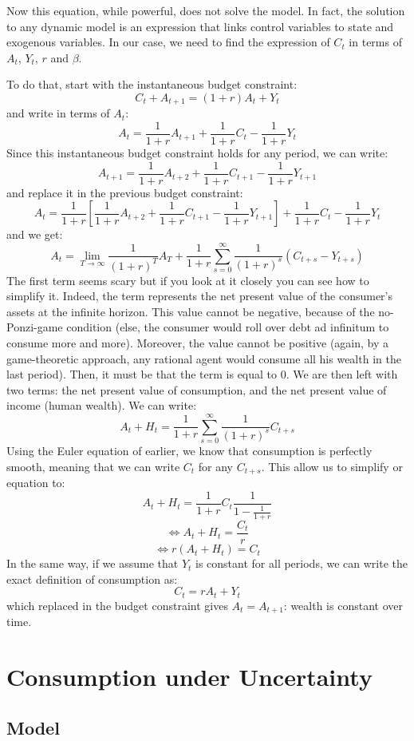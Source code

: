 \documentclass[12pt]{report}
\begin{document}
Now this equation, while powerful, does not solve the model. In fact, the solution to any dynamic model is an expression that links control variables to state and exogenous variables. In our case, we need to find the expression of $C_t$ in terms of $A_t$, $Y_t$, $r$ and $\beta$.

To do that, start with the instantaneous budget constraint: $$C_t + A_{t+1} = (1+r)A_t + Y_t $$ and write in terms of $A_t$: $$A_t = \frac{1}{1+r}A_{t+1} +\frac{1}{1+r}C_t - \frac{1}{1+r}Y_t $$ Since this instantaneous budget constraint holds for any period, we can write: $$A_{t+1} = \frac{1}{1+r}A_{t+2} +\frac{1}{1+r}C_{t+1} - \frac{1}{1+r}Y_{t+1} $$ and replace it in the previous budget constraint: $$A_t = \frac{1}{1+r}\left[\frac{1}{1+r}A_{t+2} +\frac{1}{1+r}C_{t+1} - \frac{1}{1+r}Y_{t+1}\right] +\frac{1}{1+r}C_t - \frac{1}{1+r}Y_t $$ and we get: $$A_t = \lim_{T\to\infty}\frac{1}{(1+r)^T}A_T + \frac{1}{1+r}\sum_{s=0}^{\infty}\frac{1}{(1+r)^s}(C_{t+s} - Y_{t+s}) $$ The first term seems scary but if you look at it closely you can see how to simplify it. Indeed, the term represents the net present value of the consumer's assets at the infinite horizon. This value cannot be negative, because of the no-Ponzi-game condition (else, the consumer would roll over debt ad infinitum to consume more and more). Moreover, the value cannot be positive (again, by a game-theoretic approach, any rational agent would consume all his wealth in the last period). Then, it must be that the term is equal to 0. We are then left with two terms: the net present value of consumption, and the net present value of income (human wealth). We can write: $$A_t + H_t = \frac{1}{1+r}\sum_{s=0}^{\infty}\frac{1}{(1+r)^s}C_{t+s} $$ Using the Euler equation of earlier, we know that consumption is perfectly smooth, meaning that we can write $C_t$ for any $C_{t+s}$. This allow us to simplify or equation to: $$A_t + H_t = \frac{1}{1+r}C_{t} \frac{1}{1 - \frac{1}{1+r}} $$ $$\Leftrightarrow A_t + H_t = \frac{C_{t}}{r} $$ $$\Leftrightarrow r(A_t + H_t) = C_{t}$$ In the same way, if we assume that $Y_t$ is constant for all periods, we can write the exact definition of consumption as: $$C_t = rA_t + Y_t $$ which replaced in the budget constraint gives $A_t = A_{t+1}$: wealth is constant over time.

\section{Consumption under Uncertainty}

\subsection{Model}
\end{document}
